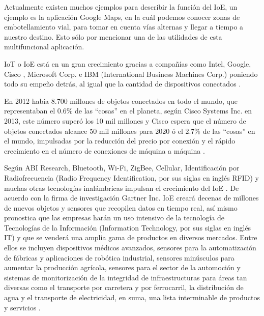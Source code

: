
Actualmente existen muchos ejemplos para describir la función del IoE, un ejemplo es la aplicación Google Maps, en la cuál podemos conocer zonas de embotellamiento vial, para tomar en cuenta vías alternas y llegar a tiempo a nuestro destino. Esto sólo por mencionar una de las utilidades de esta multifuncional aplicación.
\\ \par
IoT o IoE está en un gran crecimiento gracias a compañías como Intel, Google, Cisco , Microsoft Corp. e IBM (International Business Machines Corp.) poniendo todo su empeño detrás, al igual que la cantidad de dispositivos conectados \cite{IoEOpenMind}. 
\\ \par
En 2012 había 8.700 millones de objetos conectados en todo el mundo, que representaban el 0.6\% de las ``cosas'' en el planeta, según Cisco Systems Inc. en 2013, este número superó los 10 mil millones y Cisco espera que el número de objetos conectados alcance 50 mil millones para 2020 ó el 2.7\% de las ``cosas'' en el mundo, impulsadas por la reducción del precio por conexión y el rápido crecimiento en el número de conexiones de máquina a máquina \cite{IoELiveMint}.
\\ \par
Según ABI Research, Bluetooth, Wi-Fi, ZigBee, Cellular, Identificación por Radiofrecuencia (Radio Frequency Identification, por sus siglas en inglés RFID) y muchas otras tecnologías inalámbricas impulsan el crecimiento del IoE \cite{IoELiveMint}. De acuerdo con la firma de investigación Gartner Inc. IoE creará decenas de millones de nuevos objetos y sensores que recopilen datos en tiempo real, así mismo pronostica que las empresas harán un uso intensivo de la tecnología de Tecnologías de la Información (Information Technology, por sus siglas en inglés IT) y que se venderá una amplia gama de productos en diversos mercados. Entre ellos se incluyen dispositivos médicos avanzados, sensores para la automatización de fábricas y aplicaciones de robótica industrial, sensores minúsculos para aumentar la producción agrícola, sensores para el sector de la automoción y sistemas de monitorización de la integridad de infraestructuras para áreas tan diversas como el transporte por carretera y por ferrocarril, la distribución de agua y el transporte de electricidad, en suma, una lista interminable de productos y servicios \cite{IoEOpenMind}. \\